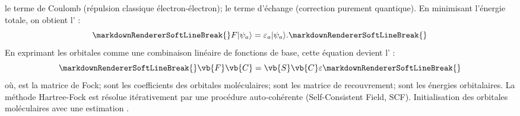 \markdownRendererUlItem {} le terme de Coulomb (répulsion classique électron-électron);\markdownRendererUlItemEnd 
\markdownRendererUlItem {} le terme d'échange (correction purement quantique).\markdownRendererUlItemEnd 
\markdownRendererUlEndTight \markdownRendererInterblockSeparator
{}
\markdownRendererSectionEnd \markdownRendererSectionBegin
{}\markdownRendererInterblockSeparator
{}En minimisant l'énergie totale, on obtient l' :\markdownRendererSoftLineBreak
{}\begin{equation}\markdownRendererSoftLineBreak
{}F|\psi_a\rangle = \varepsilon_a|\psi_a\rangle .\markdownRendererSoftLineBreak
{}\end{equation}\markdownRendererSoftLineBreak
{}En exprimant les orbitales comme une combinaison linéaire de fonctions de base, cette équation devient l' :\markdownRendererSoftLineBreak
{}\begin{equation}\markdownRendererSoftLineBreak
{}\vb{F}\vb{C} = \vb{S}\vb{C}\varepsilon\markdownRendererSoftLineBreak
{}\end{equation}\markdownRendererSoftLineBreak
{}où,\markdownRendererInterblockSeparator
{}\markdownRendererUlBeginTight
\markdownRendererUlItem {} est la matrice de Fock;\markdownRendererUlItemEnd 
\markdownRendererUlItem {} sont les coefficients des orbitales moléculaires;\markdownRendererUlItemEnd 
\markdownRendererUlItem {} sont les matrice de recouvrement;\markdownRendererUlItemEnd 
\markdownRendererUlItem \markdownRendererInlineMath{\varepsilon} sont les énergies orbitalaires.\markdownRendererUlItemEnd 
\markdownRendererUlEndTight \markdownRendererInterblockSeparator
{}\markdownRendererSectionBegin
{}\markdownRendererInterblockSeparator
{}La méthode Hartree-Fock est résolue itérativement par une procédure auto-cohérente (Self-Consistent Field, SCF).\markdownRendererInterblockSeparator
{}\markdownRendererOlBeginTight
{} Initialisation des orbitales moléculaires avec une estimation .\markdownRendererOlItemEnd 
{}\markdownRendererInterblockSeparator
